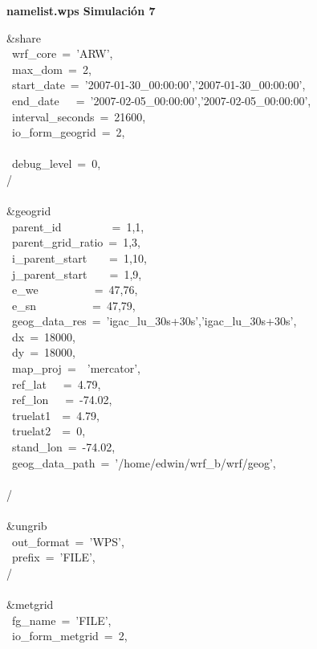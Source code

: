 
\textbf{namelist.wps Simulación 7}

\&share\\
~wrf\_core~=~'ARW',\\
~max\_dom~=~2,\\
~start\_date~=~'2007-01-30\_00:00:00','2007-01-30\_00:00:00',\\
~end\_date~~~=~'2007-02-05\_00:00:00','2007-02-05\_00:00:00',\\
~interval\_seconds~=~21600,\\
~io\_form\_geogrid~=~2,\\
\\
~debug\_level~=~0,\\
/\\
\\
\&geogrid\\
~parent\_id~~~~~~~~~=~1,1,\\
~parent\_grid\_ratio~=~1,3,\\
~i\_parent\_start~~~~=~1,10,\\
~j\_parent\_start~~~~=~1,9,\\
~e\_we~~~~~~~~~~=~47,76,\\
~e\_sn~~~~~~~~~~=~47,79,\\
~geog\_data\_res~=~'igac\_lu\_30s+30s','igac\_lu\_30s+30s',\\
~dx~=~18000,\\
~dy~=~18000,\\
~map\_proj~=~~'mercator',\\
~ref\_lat~~~=~4.79,\\
~ref\_lon~~~=~-74.02,\\
~truelat1~~=~4.79,\\
~truelat2~~=~0,\\
~stand\_lon~=~-74.02,\\
~geog\_data\_path~=~'/home/edwin/wrf\_b/wrf/geog',\\
\\
/\\
\\
\&ungrib\\
~out\_format~=~'WPS',\\
~prefix~=~'FILE',\\
/\\
\\
\&metgrid\\
~fg\_name~=~'FILE',\\
~io\_form\_metgrid~=~2,\\
\\
